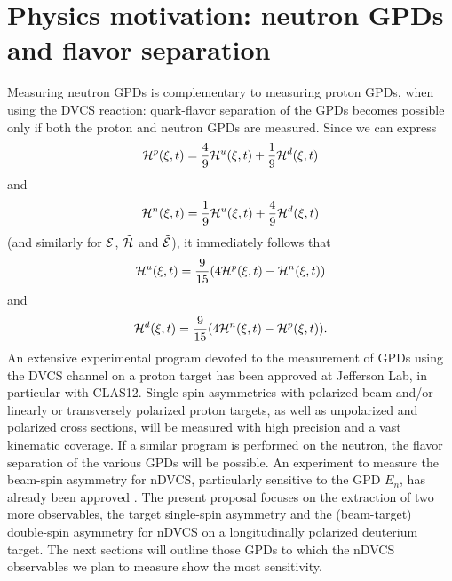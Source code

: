 \section{Physics motivation: neutron GPDs and flavor separation}
Measuring neutron GPDs is complementary to measuring proton GPDs, when using the DVCS reaction: %
quark-flavor separation of the GPDs becomes possible only if both the proton and neutron GPDs are measured. 
Since we can express 
\begin{eqnarray}
{\cal H}^p(\xi, t)=\frac{4}{9}{\cal H}^u(\xi, t)+\frac{1}{9}{\cal H}^d(\xi, t)
\end{eqnarray}
and
\begin{eqnarray}
{\cal H}^n(\xi, t)=\frac{1}{9}{\cal H}^u(\xi, t)+\frac{4}{9}{\cal H}^d(\xi, t)  
\end{eqnarray}
(and similarly for ${\cal E}$, ${\tilde {\cal H}}$ and ${\tilde {\cal E}}$), it immediately follows that
\begin{eqnarray}
{\cal H}^u(\xi, t)=\frac{9}{15}(4 {\cal H}^p(\xi, t)-{\cal H}^n(\xi, t))
\end{eqnarray}
and
\begin{eqnarray}
{\cal H}^d(\xi, t)=\frac{9}{15}(4 {\cal H}^n(\xi, t)-{\cal H}^p(\xi, t)).  
\end{eqnarray}
An extensive experimental program devoted to the measurement of GPDs using the DVCS channel on a proton target has been approved at Jefferson Lab, in particular with CLAS12. Single-spin asymmetries with polarized beam and/or linearly or transversely polarized proton targets, as well as unpolarized and polarized cross sections, will be measured with high precision and a vast kinematic coverage. If a similar program is performed on the neutron, the flavor separation of the various GPDs will be possible. 
An experiment to measure the beam-spin asymmetry for nDVCS, particularly sensitive to the GPD $E_n$, has already been approved \cite{proposal}. The present proposal focuses on the extraction of two more observables, the target single-spin asymmetry and the (beam-target) double-spin asymmetry for nDVCS on a longitudinally polarized deuterium target. The next sections will outline those GPDs to which the nDVCS observables we plan to measure show the most sensitivity. 
